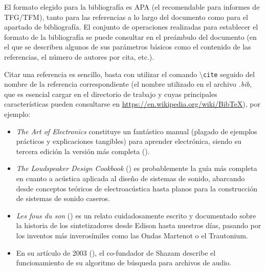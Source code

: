 

\newpage

El formato elegido para la bibliografía es APA (el recomendable para informes de TFG/TFM), tanto para las referencias a lo largo del documento como para el apartado de bibliografía. El conjunto de operaciones realizadas para establecer el formato de la bibliografía se puede consultar en el preámbulo del documento (en el que se describen algunos de sus parámetros básicos como el contenido de las referencias, el número de autores por cita, etc.).

Citar una referencia es sencillo, basta con utilizar el comando \textbackslash\texttt{cite} seguido del nombre de la referencia correspondiente (el nombre utilizado en el archivo \textit{.bib}, que es esencial cargar en el directorio de trabajo y cuyas principales características pueden consultarse en \url{https://en.wikipedia.org/wiki/BibTeX}), por ejemplo:

\begin{itemize}
    \item \textit{The Art of Electronics} constituye un fantástico manual (plagado de ejemplos prácticos y explicaciones tangibles) para aprender electrónica, siendo su tercera edición la versión más completa (\cite{horowitz2015}).
    \item \textit{The Loudspeaker Design Cookbook} (\cite{dickson2007}) es probablemente la guía más completa en cuanto a acústica aplicada al diseño de sistemas de sonido, abarcando desde conceptos teóricos de electroacústica hasta planos para la construcción de sistemas de sonido caseros.
    \item \textit{Les fous du son} (\cite{dewilde2016}) es un relato cuidadosamente escrito y documentado sobre la historia de los sintetizadores desde Edison hasta nuestros días, pasando por los inventos más inverosímiles como las Ondas Martenot o el Trautonium.
    \item En su artículo de 2003 (\cite{wang2003}), el co-fundador de Shazam describe el funcionamiento de su algoritmo de búsqueda para archivos de audio.
\end{itemize}

\appto{\bibsetup}{\sloppy}
\printbibliography[heading=bibintoc, title=BIBLIOGRAFÍA] %



